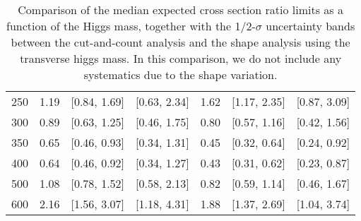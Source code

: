 \begin{table}[!ht]
\begin{center}
{\begin{tabular}{|l|c|c|c|c|c|c|}
\hline
250 & 1.19 & [0.84, 1.69] & [0.63, 2.34] & 1.62 & [1.17, 2.35] & [0.87, 3.09] \\
300 & 0.89 & [0.63, 1.25] & [0.46, 1.75] & 0.80 & [0.57, 1.16] & [0.42, 1.56] \\
350 & 0.65 & [0.46, 0.93] & [0.34, 1.31] & 0.45 & [0.32, 0.64] & [0.24, 0.92] \\
400 & 0.64 & [0.46, 0.92] & [0.34, 1.27] & 0.43 & [0.31, 0.62] & [0.23, 0.87]\\
500 & 1.08 & [0.78, 1.52] & [0.58, 2.13] & 0.82 & [0.59, 1.14] & [0.46, 1.67] \\
600 & 2.16 & [1.56, 3.07] & [1.18, 4.31] & 1.88 & [1.37, 2.69] & [1.04, 3.74]\\
\hline
\end{tabular}
}
\caption{\fixme Comparison of the median expected cross section ratio limits as a function 
of the Higgs mass, together with the 1/2-$\sigma$ uncertainty bands between the cut-and-count 
analysis and the shape analysis using the transverse higgs mass. 
In this comparison, we do not include any systematics due to the shape variation. }
\label{tab:mvashape_mevsbdt_hzz}
\end{center}
\end{table}





